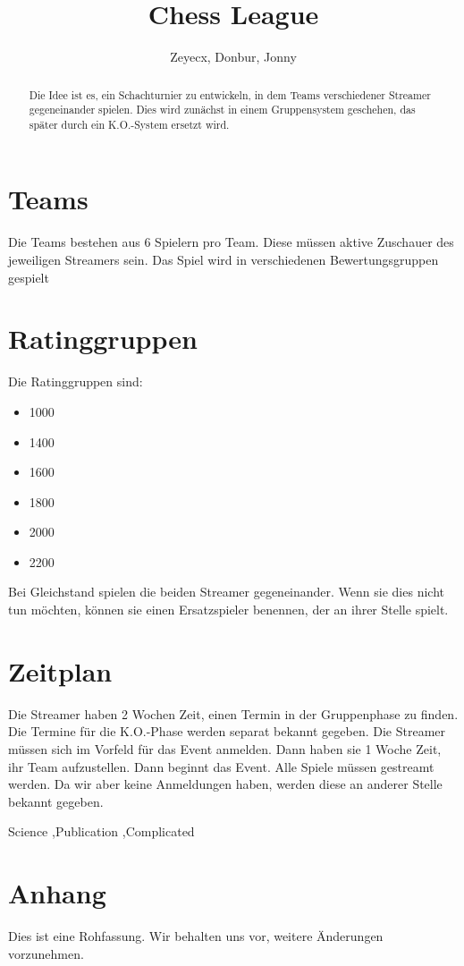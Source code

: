 \documentclass[preprint,12pt]{elsarticle}
\begin{document}
	
\begin{frontmatter}
		
		
\title{Chess League}
		
\author{Zeyecx, Donbur, Jonny}
		
\address{German Paper}
	 
\begin{abstract}
	Die Idee ist es, ein Schachturnier zu entwickeln, in dem Teams verschiedener Streamer gegeneinander spielen.
	Dies wird zunächst in einem Gruppensystem geschehen, das später durch ein K.O.-System ersetzt wird. 
\end{abstract}
\end{frontmatter}
\linenumbers
\section{Teams}
Die Teams bestehen aus 6 Spielern pro Team. Diese müssen aktive Zuschauer des jeweiligen Streamers sein. 
Das Spiel wird in verschiedenen Bewertungsgruppen gespielt

\section{Ratinggruppen}

Die Ratinggruppen sind:
\begin{itemize}
	\item 1000
	\item 1400 
	\item 1600
	\item 1800
	\item 2000
	\item 2200
\end{itemize}
Bei Gleichstand spielen die beiden Streamer gegeneinander. Wenn sie dies nicht tun möchten, können sie einen Ersatzspieler benennen, der an ihrer Stelle spielt.

\section{Zeitplan}
Die Streamer haben 2 Wochen Zeit, einen Termin in der Gruppenphase zu finden. Die Termine für die K.O.-Phase werden separat bekannt gegeben.
Die Streamer müssen sich im Vorfeld für das Event anmelden. Dann haben sie 1 Woche Zeit, ihr Team aufzustellen.
Dann beginnt das Event.
Alle Spiele müssen gestreamt werden.
Da wir aber keine Anmeldungen haben, werden diese an anderer Stelle bekannt gegeben.


\begin{keyword}
	Science \sep Publication \sep Complicated
	
	
\end{keyword}
\section{Anhang}
Dies ist eine Rohfassung. Wir behalten uns vor, weitere Änderungen vorzunehmen.






\linenumbers


	
	
	
	
\end{document}
